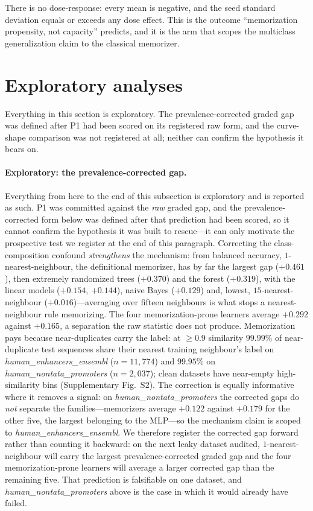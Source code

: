\documentclass[11pt,a4paper]{article}
\begin{document}
There is no dose-response: every mean is negative, and the seed standard deviation equals or exceeds
any dose effect. This is the outcome ``memorization propensity, not capacity'' predicts, and it is
the arm that scopes the multiclass generalization claim to the classical memorizer.


\section{Exploratory analyses}\label{sec:s-exploratory}
Everything in this section is exploratory. The prevalence-corrected graded gap was defined
after P1 had been scored on its registered raw form, and the curve-shape comparison was not
registered at all; neither can confirm the hypothesis it bears on.

\paragraph{Exploratory: the prevalence-corrected gap.} Everything from here to the end of this subsection is exploratory and is reported as such. P1 was committed against the \emph{raw} graded gap, and the prevalence-corrected form below was defined after that prediction had been scored, so it cannot confirm the hypothesis it was built to rescue---it can only motivate the prospective test we register at the end of this paragraph. Correcting the class-composition confound \emph{strengthens} the mechanism: from balanced accuracy, $1$-nearest-neighbour, the definitional memorizer, has by far the largest gap ($+0.461$), then extremely randomized trees ($+0.370$) and the forest ($+0.319$), with the linear models ($+0.154$, $+0.144$), naive Bayes ($+0.129$) and, lowest, $15$-nearest-neighbour ($+0.016$)---averaging over fifteen neighbours is what stops a nearest-neighbour rule memorizing. The four memorization-prone learners average $+0.292$ against $+0.165$, a separation the raw statistic does not produce. Memorization pays because near-duplicates carry the label: at $\ge0.9$ similarity $99.99\%$ of near-duplicate test sequences share their nearest training neighbour's label on \textit{human\_enhancers\_ensembl} ($n=11{,}774$) and $99.95\%$ on \textit{human\_nontata\_promoters} ($n=2{,}037$); clean datasets have near-empty high-similarity bins (Supplementary Fig.~S2). The correction is equally informative where it removes a signal: on \textit{human\_nontata\_promoters} the corrected gaps do \emph{not} separate the families---memorizers average $+0.122$ against $+0.179$ for the other five, the largest belonging to the MLP---so the mechanism claim is scoped to \textit{human\_enhancers\_ensembl}. We therefore register the corrected gap forward rather than counting it backward: on the next leaky dataset audited, $1$-nearest-neighbour will carry the largest prevalence-corrected graded gap and the four memorization-prone learners will average a larger corrected gap than the remaining five. That prediction is falsifiable on one dataset, and \textit{human\_nontata\_promoters} above is the case in which it would already have failed.
\end{document}
